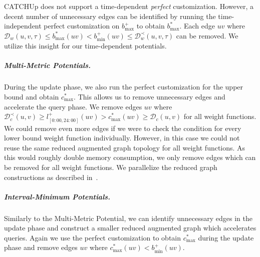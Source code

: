 \documentclass[a4paper,UKenglish,cleveref, autoref, thm-restate,anonymous]{lipics-v2021}
\newcommand*{\comb}{c}
\newcommand*{\dist}{\mathcal{D}}
\newcommand*{\tdep}{\tau^{\operatorname{dep}}}
\newcommand*{\tmax}{\tau^{\max}}
\begin{document}
CATCHUp does not support a time-dependent \emph{perfect} customization.
However, a decent number of unnecessary edges can be identified by running the time-independent perfect customization on $b^+_{\max}$ to obtain $b^*_{\max}$.
Each edge $uv$ where $\dist_w(u,v,\tau) \leq b^*_{\max}(uv) < b^+_{\min}(uv) \leq \dist^{\prec}_w(u,v,\tau)$ can be removed.
We utilize this insight for our time-dependent potentials.

\subparagraph{Multi-Metric Potentials.}
During the update phase, we also run the perfect customization for the upper bound and obtain $\comb^*_{\max}$.
This allows us to remove unnecessary edges and accelerate the query phase.
We remove edges $uv$ where $\dist^{\prec}_c(u,v) \geq l_{[0:00, 24:00]}^+(uv) > \comb^*_{\max}(uv) \geq \dist_c(u,v)$ for all weight functions.
We could remove even more edges if we were to check the condition for every lower bound weight function individually.
However, in this case we could not reuse the same reduced augmented graph topology for all weight functions.
As this would roughly double memory consumption, we only remove edges which can be removed for all weight functions.
We parallelize the reduced graph constructions as described in~\cite{bsw-rttau-19}.


\subparagraph{Interval-Minimum Potentials.}
Similarly to the Multi-Metric Potential, we can identify unnecessary edges in the update phase and construct a smaller reduced augmented graph which accelerates queries.
Again we use the perfect customization to obtain $\comb^*_{\max}$ during the update phase and remove edges $uv$ where $\comb^*_{\max}(uv) < b^+_{\min}(uv)$.%
\end{document}
